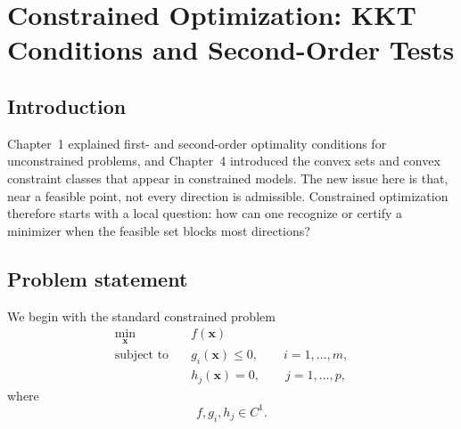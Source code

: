 \chapter{Constrained Optimization: KKT Conditions and Second-Order Tests}

\graphicspath{{chapters/07_constrained_optimization/figures}}

\begin{abstract}
This chapter develops local optimality conditions for constrained problems:
feasible directions, tangent cones, constraint qualifications, first-order KKT
conditions, second-order tests, and representative examples.
\end{abstract}


\section{Introduction}
Chapter~1 explained first- and second-order optimality conditions for
unconstrained problems, and Chapter~4 introduced the convex sets and convex
constraint classes that appear in constrained models. The new issue here is
that, near a feasible point, not every direction is admissible. Constrained
optimization therefore starts with a local question: how can one recognize or
certify a minimizer when the feasible set blocks most directions?



\section{Problem statement}
\label{sec:ch7-problem}
We begin with the standard constrained problem
\begin{equation}
  \label{eq:ch7-problem}
  \begin{aligned}
    \min_{\mathbf{x}} \quad & f(\mathbf{x}) \\
    \text{subject to}\quad & g_i(\mathbf{x}) \le 0, \qquad i=1,\dots,m, \\
    & h_j(\mathbf{x}) = 0, \qquad j=1,\dots,p,
  \end{aligned}
\end{equation}
where
\[
  f, g_i, h_j \in C^1.
\]

